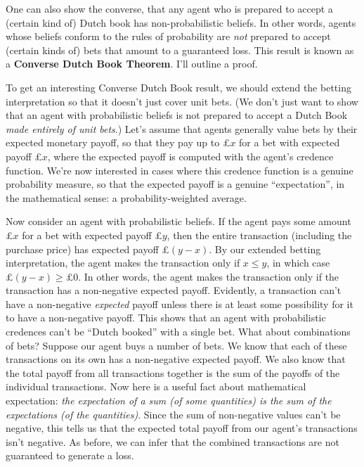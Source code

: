 One can also show the converse, that any agent who is prepared to accept a
(certain kind of) Dutch book has non-probabilistic beliefs. In other words,
agents whose beliefs conform to the rules of probability are \emph{not} prepared
to accept (certain kinds of) bets that amount to a guaranteed loss. This result
is known as a \textbf{Converse Dutch Book Theorem}. I'll outline a proof.

To get an interesting Converse Dutch Book result, we should extend the betting
interpretation so that it doesn't just cover unit bets. (We don't just want to
show that an agent with probabilistic beliefs is not prepared to accept a Dutch
Book \emph{made entirely of unit bets}.) Let's assume that agents generally
value bets by their expected monetary payoff, so that they pay up to £$x$ for a
bet with expected payoff £$x$, where the expected payoff is computed with the
agent's credence function. We're now interested in cases where this credence
function is a genuine probability measure, so that the expected payoff is a
genuine ``expectation'', in the mathematical sense: a probability-weighted
average.

Now consider an agent with probabilistic beliefs.
If the agent pays some amount £$x$ for a bet
with expected payoff £$y$, then the entire transaction (including the purchase
price) has expected payoff £$(y\!-\!x)$.
By our extended betting interpretation, the agent makes the transaction only if
$x \leq y$, in which case $£(y\!-\!x) \geq £0$. In other words, the agent makes
the transaction only if the transaction has a non-negative expected payoff.
Evidently, a transaction can't have a non-negative \emph{expected} payoff unless
there is at least some possibility for it to have a non-negative payoff. This
shows that an agent with probabilistic credences can't be ``Dutch booked'' with a
single bet. What about combinations of bets? Suppose our agent buys a number of
bets. We know that each of these transactions on its own has a non-negative
expected payoff. We also know that the total payoff from all transactions
together is the sum of the payoffs of the individual transactions. Now here is a
useful fact about mathematical expectation: \emph{the expectation of a sum (of
  some quantities) is the sum of the expectations (of the quantities)}. Since
the sum of non-negative values can't be negative, this tells us that the
expected total payoff from our agent's transactions isn't negative. As before,
we can infer that the combined transactions are not guaranteed to generate a
loss.

